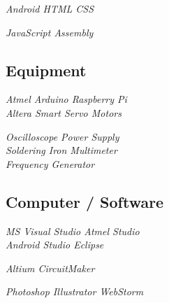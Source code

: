\documentclass[]{aftab-resume}
\begin{document}
\begin{minipage}[t]{0.33\textwidth}
\it{\textbullet{} Android \textbullet{} HTML \textbullet{} CSS \\}
\vspace{0.05cm}

\it{\textbullet{} JavaScript \textbullet{} Assembly \\}

\sectionsep


\subsection{Equipment}
\vspace{0.01cm}

\it{\textbullet{} Atmel \textbullet{} Arduino \textbullet{} Raspberry Pi \\}
\it{\textbullet{} Altera \textbullet{} Smart Servo Motors \\}
\vspace{0.05cm}

\it{\textbullet{} Oscilloscope \textbullet{} Power Supply \\}
\it{\textbullet{} Soldering Iron \textbullet{} Multimeter \\}
\it{\textbullet{} Frequency Generator \\}
\sectionsep


\subsection{Computer / Software}
\vspace{0.01cm}

\it{\textbullet{} MS Visual Studio \textbullet{} Atmel Studio \\}
\it{\textbullet{} Android Studio \textbullet{} Eclipse \\}
\vspace{0.075cm}

\it{\textbullet{} Altium \textbullet{} CircuitMaker \\}
\vspace{0.075cm}

\it{\textbullet{} Photoshop \textbullet{} Illustrator \textbullet{} WebStorm \\}
\vspace{0.075cm}


\end{minipage}
\end{document}
